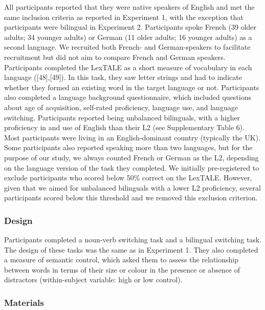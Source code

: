 \documentclass[
]{article}
\begin{document}
All participants reported that they were native speakers of English and met the same inclusion criteria as reported in Experiment 1, with the exception that participants were bilingual in Experiment 2. Participants spoke French (39 older adults; 34 younger adults) or German (11 older adults; 16 younger adults) as a second language. We recruited both French- and German-speakers to facilitate recruitment but did not aim to compare French and German speakers. Participants completed the LexTALE as a short measure of vocabulary in each language ({[}48{]},{[}49{]}). In this task, they saw letter strings and had to indicate whether they formed an existing word in the target language or not. Participants also completed a language background questionnaire, which included questions about age of acquisition, self-rated proficiency, language use, and language switching. Participants reported being unbalanced bilinguals, with a higher proficiency in and use of English than their L2 (see Supplementary Table 6). Most participants were living in an English-dominant country (typically the UK). Some participants also reported speaking more than two languages, but for the purpose of our study, we always counted French or German as the L2, depending on the language version of the task they completed. We initially pre-registered to exclude participants who scored below 50\% correct on the LexTALE. However, given that we aimed for unbalanced bilinguals with a lower L2 proficiency, several participants scored below this threshold and we removed this exclusion criterion.

\hypertarget{design-1}{%
\subsubsection{Design}\label{design-1}}

Participants completed a noun-verb switching task and a bilingual switching task. The design of these tasks was the same as in Experiment 1. They also completed a measure of semantic control, which asked them to assess the relationship between words in terms of their size or colour in the presence or absence of distractors (within-subject variable: high or low control).

\hypertarget{materials-1}{%
\subsubsection{Materials}\label{materials-1}}
\end{document}
